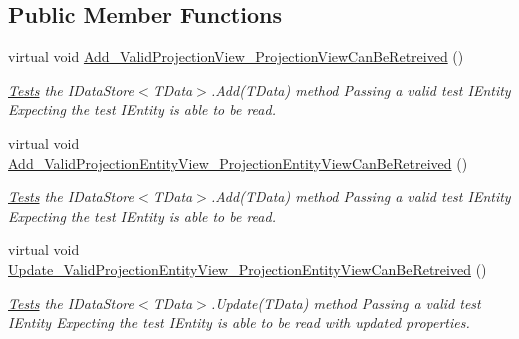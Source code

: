 \subsection*{Public Member Functions}
\begin{DoxyCompactItemize}
\item 
virtual void \hyperlink{classCqrs_1_1Azure_1_1BlobStorage_1_1Test_1_1Integration_1_1TableStorageDataStoreTests_a4d5cbb9f8690e2eff9529966e6816b5c_a4d5cbb9f8690e2eff9529966e6816b5c}{Add\+\_\+\+Valid\+Projection\+View\+\_\+\+Projection\+View\+Can\+Be\+Retreived} ()
\begin{DoxyCompactList}\small\item\em \hyperlink{namespaceCqrs_1_1Tests}{Tests} the I\+Data\+Store$<$\+T\+Data$>$.\+Add(\+T\+Data) method Passing a valid test I\+Entity Expecting the test I\+Entity is able to be read. \end{DoxyCompactList}\item 
virtual void \hyperlink{classCqrs_1_1Azure_1_1BlobStorage_1_1Test_1_1Integration_1_1TableStorageDataStoreTests_acd703f5ee0699216338b5cd5e41d771a_acd703f5ee0699216338b5cd5e41d771a}{Add\+\_\+\+Valid\+Projection\+Entity\+View\+\_\+\+Projection\+Entity\+View\+Can\+Be\+Retreived} ()
\begin{DoxyCompactList}\small\item\em \hyperlink{namespaceCqrs_1_1Tests}{Tests} the I\+Data\+Store$<$\+T\+Data$>$.\+Add(\+T\+Data) method Passing a valid test I\+Entity Expecting the test I\+Entity is able to be read. \end{DoxyCompactList}\item 
virtual void \hyperlink{classCqrs_1_1Azure_1_1BlobStorage_1_1Test_1_1Integration_1_1TableStorageDataStoreTests_ae2ea908fde732d4466091b01597918c6_ae2ea908fde732d4466091b01597918c6}{Update\+\_\+\+Valid\+Projection\+Entity\+View\+\_\+\+Projection\+Entity\+View\+Can\+Be\+Retreived} ()
\begin{DoxyCompactList}\small\item\em \hyperlink{namespaceCqrs_1_1Tests}{Tests} the I\+Data\+Store$<$\+T\+Data$>$.\+Update(\+T\+Data) method Passing a valid test I\+Entity Expecting the test I\+Entity is able to be read with updated properties. \end{DoxyCompactList}\end{DoxyCompactItemize}
